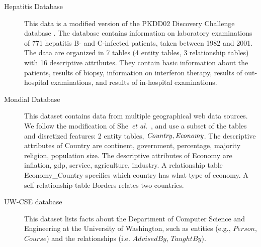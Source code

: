 \documentclass[runningheads,a4paper]{llncs}
\newcommand{\etal}{\textit{et al.}}
\begin{document}
\begin{description}
\item[Hepatitis Database] This data is a modified version of the PKDD02 Discovery Challenge database \cite{Frank2007}. %
The database contains information on laboratory examinations of 771 hepatitis B- and C-infected patients, taken
between 1982 and 2001. The data are organized in 7 tables (4 entity tables,  3 relationship tables) with 16 descriptive attributes. They contain basic information about the patients, results of biopsy, information on interferon therapy, results of out-hospital examinations, and results of in-hospital examinations. 

\item[Mondial Database] 
%
%
This dataset contains data from multiple geographical web data sources. 
We follow the modification of She~\etal~\cite{wangMondial}, and use a subset of the tables and disretized features: 2 entity tables, $\it{Country},\it{Economy}$. The descriptive attributes of Country are continent, government, percentage, majority religion, population size. The descriptive attributes of Economy are inflation, gdp, service, agriculture, industry. A relationship table Economy\_Country specifies which country has what type of economy. A self-relationship table Borders relates two countries.



\item[UW-CSE database] This dataset lists facts about the Department of Computer Science and Engineering at the University of Washington, such as entities (e.g., $Person$, $Course$) and the relationships (i.e. $AdvisedBy$, $TaughtBy$).

\end{description}
\end{document}
